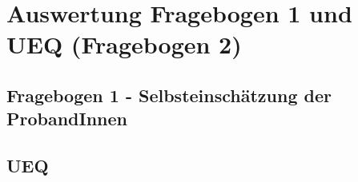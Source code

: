 \section{Auswertung Fragebogen 1 und UEQ (Fragebogen 2)}
\subsection{Fragebogen 1 - Selbsteinschätzung der ProbandInnen}
\subsection{UEQ}

